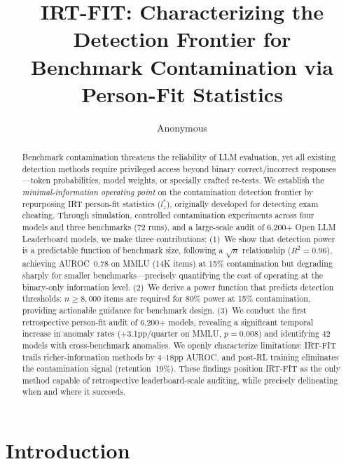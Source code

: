 \documentclass[11pt,a4paper]{article}
\title{IRT-FIT: Characterizing the Detection Frontier for\\Benchmark Contamination via Person-Fit Statistics}
\author{Anonymous}
\date{}
\begin{document}
\maketitle

\begin{abstract}
Benchmark contamination threatens the reliability of LLM evaluation, yet all existing detection methods require privileged access beyond binary correct/incorrect responses---token probabilities, model weights, or specially crafted re-tests. We establish the \emph{minimal-information operating point} on the contamination detection frontier by repurposing IRT person-fit statistics ($l_z^*$), originally developed for detecting exam cheating. Through simulation, controlled contamination experiments across four models and three benchmarks (72 runs), and a large-scale audit of 6{,}200+ Open LLM Leaderboard models, we make three contributions: (1)~We show that detection power is a predictable function of benchmark size, following a $\sqrt{n}$ relationship ($R^2=0.96$), achieving AUROC~0.78 on MMLU (14K items) at 15\% contamination but degrading sharply for smaller benchmarks---precisely quantifying the cost of operating at the binary-only information level. (2)~We derive a power function that predicts detection thresholds: $n \geq 8{,}000$ items are required for 80\% power at 15\% contamination, providing actionable guidance for benchmark design. (3)~We conduct the first retrospective person-fit audit of 6{,}200+ models, revealing a significant temporal increase in anomaly rates (+3.1pp/quarter on MMLU, $p=0.008$) and identifying 42 models with cross-benchmark anomalies. We openly characterize limitations: IRT-FIT trails richer-information methods by 4--18pp AUROC, and post-RL training eliminates the contamination signal (retention~19\%). These findings position IRT-FIT as the only method capable of retrospective leaderboard-scale auditing, while precisely delineating when and where it succeeds.
\end{abstract}


\section{Introduction}
\label{sec:intro}
\end{document}
